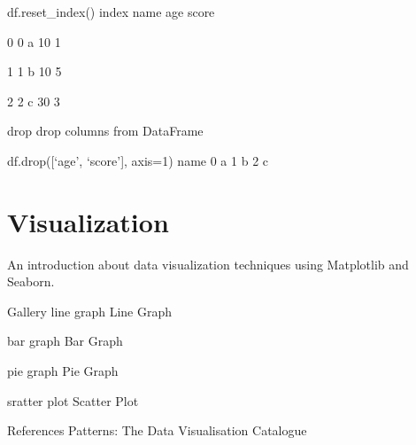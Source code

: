df.reset_index()
index name age score

0 0 a 10 1

1 1 b 10 5

2 2 c 30 3

drop
drop columns from DataFrame

df.drop([‘age’, ‘score’], axis=1)
name
0	a
1	b
2	c

\section{Visualization}

An introduction about data visualization techniques using Matplotlib and Seaborn.

Gallery
 line graph
Line Graph

 bar graph
Bar Graph

 pie graph
Pie Graph

 sratter plot
Scatter Plot

References
Patterns: The Data Visualisation Catalogue



